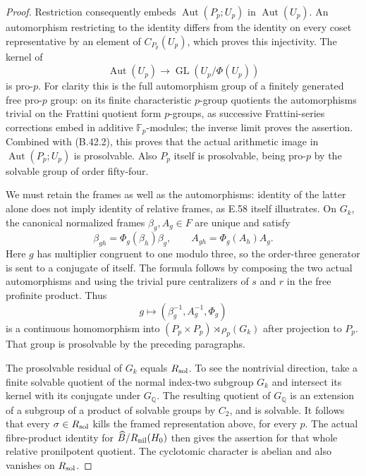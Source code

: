 \begin{proof}
Restriction consequently embeds
$\operatorname{Aut}(P_p;U_p)$ in
$\operatorname{Aut}(U_p)$.  An automorphism
restricting to the identity differs from the
identity on every coset representative by an
element of $C_{P_p}(U_p)$, which proves this
injectivity.  The kernel of
\[
 \operatorname{Aut}(U_p)\longrightarrow
     \operatorname{GL}(U_p/\Phi(U_p))
\]
is pro-$p$.  For clarity this is the full
automorphism group of a finitely generated
free pro-$p$ group: on its finite characteristic
$p$-group quotients the automorphisms trivial
on the Frattini quotient form $p$-groups,
as successive Frattini-series corrections
embed in additive $\mathbb F_p$-modules;
the inverse limit proves the assertion.
Combined with (B.42.2), this proves that the
actual arithmetic image in
$\operatorname{Aut}(P_p;U_p)$ is prosolvable.
Also $P_p$ itself is prosolvable, being pro-$p$
by the solvable group of order fifty-four.

We must retain the frames as well as the
automorphisms: identity of the latter alone
does not imply identity of relative frames,
as E.58 itself illustrates.  On $G_k$, the
canonical normalized frames $\beta_g,A_g\in F$
are unique and satisfy
\[
 \beta_{gh}=\Phi_g(\beta_h)\beta_g,\qquad
        A_{gh}=\Phi_g(A_h)A_g.                              \tag{B.42.3}
\]
Here $g$ has multiplier congruent to one
modulo three, so the order-three generator
is sent to a conjugate of itself.  The
formula follows by composing the two actual
automorphisms and using the trivial pure
centralizers of $s$ and $r$ in the free
profinite product.  Thus
\[
 g\longmapsto
  (\beta_g^{-1},A_g^{-1},\Phi_g)
\]
is a continuous homomorphism into
$(P_p\times P_p)\rtimes\rho_p(G_k)$ after
projection to $P_p$.  That group is
prosolvable by the preceding paragraphs.

The prosolvable residual of $G_k$ equals
$R_{\rm sol}$.  To see the nontrivial direction,
take a finite solvable quotient of the
normal index-two subgroup $G_k$ and
intersect its kernel with its conjugate
under $G_{\mathbb Q}$.  The resulting
quotient of $G_{\mathbb Q}$ is an extension
of a subgroup of a product of solvable
groups by $C_2$, and is solvable.  It
follows that every $\sigma\in R_{\rm sol}$
kills the framed representation above,
for every $p$.  The actual fibre-product
identity for $\widehat B/R_{\rm nil}(H_0)$
then gives the assertion for that whole
relative pronilpotent quotient.  The
cyclotomic character is abelian and also
vanishes on $R_{\rm sol}$.


\end{proof}
